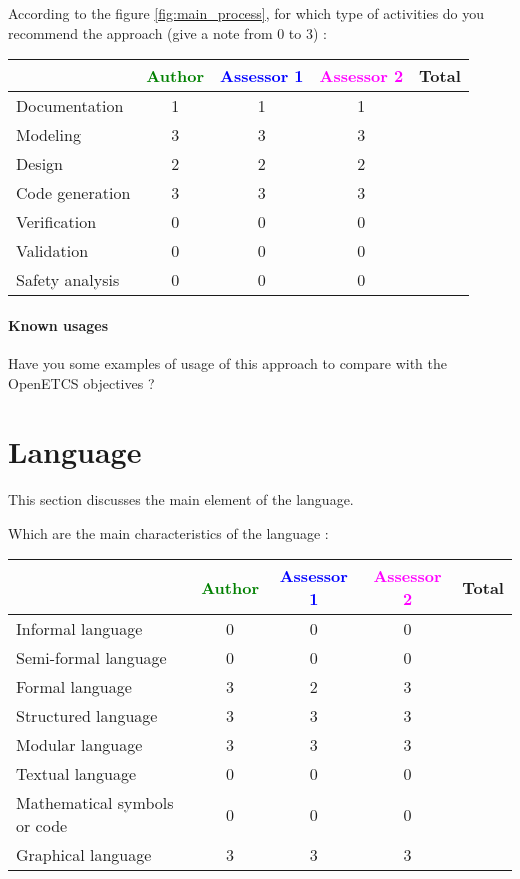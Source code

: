According to the figure \ref{fig:main_process}, for which type of activities do you recommend the approach (give a note from 0 to  3) :

\begin{tabular}{|l | c | c | c | c|}
\hline
& \textcolor{green}{Author} & \textcolor{blue}{Assessor 1} & \textcolor{magenta}{Assessor 2} & Total \\
\hline 
Documentation &1 &1 & 1 &  \\
\hline
Modeling &3 &3 & 3&  \\
\hline
Design &2 &2 & 2 & \\
\hline
Code generation &3 &3 & 3& \\
\hline
Verification &0 &0 & 0& \\
\hline
Validation &0 &0 & 0& \\
\hline
Safety analysis &0 &0 & 0& \\
\hline
\end{tabular}

\paragraph{Known usages} Have you some examples of usage of this approach to  compare with the OpenETCS objectives ?

\section{Language}
This section discusses the main element of the language.

Which are the main characteristics of the language :

\begin{tabular}{|l | c | c | c | c|}
  \hline
  & \textcolor{green}{Author} & \textcolor{blue}{Assessor 1} & \textcolor{magenta}{Assessor 2} & Total \\
  \hline 
  Informal language &0 &0 & 0&  \\
  \hline 
  Semi-formal language &0 &0 & 0&  \\
  \hline
  Formal language &3 &2 & 3&  \\
  \hline
  Structured language &3 &3 & 3& \\
  \hline
  Modular language &3 &3 & 3& \\
  \hline
  Textual language &0 &0 & 0& \\
  \hline
  Mathematical symbols or code &0 &0 & 0& \\
  \hline
  Graphical language &3 &3 & 3& \\
  \hline
\end{tabular}

